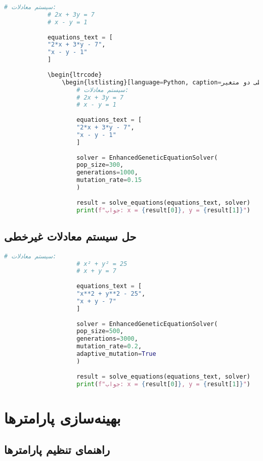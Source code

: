 \documentclass[12pt,a4paper]{article}
\newenvironment{ltrcode}{\lr\bgroup}{\egroup}
\begin{document}
	\begin{ltrcode}
		\begin{lstlisting}[language=Python, caption=مثال سیستم خطی دو متغیر]
			# سیستم معادلات:
			# 2x + 3y = 7
			# x - y = 1
			
			equations_text = [
			"2*x + 3*y - 7",
			"x - y - 1"
			]
			
			\begin{ltrcode}
				\begin{lstlisting}[language=Python, caption=مثال سیستم خطی دو متغیر]
					# سیستم معادلات:
					# 2x + 3y = 7
					# x - y = 1
					
					equations_text = [
					"2*x + 3*y - 7",
					"x - y - 1"
					]
					
					solver = EnhancedGeneticEquationSolver(
					pop_size=300,
					generations=1000,
					mutation_rate=0.15
					)
					
					result = solve_equations(equations_text, solver)
					print(f"جواب: x = {result[0]}, y = {result[1]}")
				\end{lstlisting}
			\end{ltrcode}
			
			\subsection{حل سیستم معادلات غیرخطی}
			
			\begin{ltrcode}
				\begin{lstlisting}[language=Python, caption=مثال سیستم غیرخطی]
					# سیستم معادلات:
					# x² + y² = 25
					# x + y = 7
					
					equations_text = [
					"x**2 + y**2 - 25",
					"x + y - 7"
					]
					
					solver = EnhancedGeneticEquationSolver(
					pop_size=500,
					generations=3000,
					mutation_rate=0.2,
					adaptive_mutation=True
					)
					
					result = solve_equations(equations_text, solver)
					print(f"جواب: x = {result[0]}, y = {result[1]}")
				\end{lstlisting}
			\end{ltrcode}
			
			\section{بهینه‌سازی پارامترها}
			
			\subsection{راهنمای تنظیم پارامترها}
			
\end{document}
